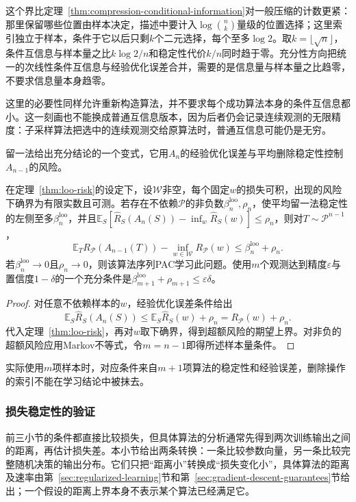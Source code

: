 这个界比定理~\ref{thm:compression-conditional-information}对一般压缩的计数更紧：那里保留哪些位置由样本决定，描述中要计入$\log\binom nk$量级的位置选择；这里索引独立于样本，条件于它以后只剩$k$个二元选择，每个至多$\log2$。取$k=\lfloor\sqrt n\rfloor$，条件互信息与样本量之比$k\log2/n$和稳定性代价$k/n$同时趋于零。充分性方向把统一的次线性条件互信息与经验优化误差合并，需要的是信息量与样本量之比趋零，不要求信息量本身趋零。

这里的必要性同样允许重新构造算法，并不要求每个成功算法本身的条件互信息都小。这一刻画也不能换成普通互信息版本，因为后者仍会记录连续观测的无限精度：子采样算法把选中的连续观测交给原算法时，普通互信息可能仍是无穷。

留一法给出充分结论的一个变式，它用$A_n$的经验优化误差与平均删除稳定性控制$A_{n-1}$的风险。

\begin{theorem}[留一法稳定性与可学习性]
\label{thm:loo-learning}
在定理~\ref{thm:loo-risk}的设定下，设$\mathcal W$非空，每个固定$w$的损失可积，出现的风险下确界为有限实数且可测。若存在不依赖$\mathcal P$的非负数$\beta_n^{\mathrm{loo}},\rho_n$，使平均留一法稳定性的左侧至多$\beta_n^{\mathrm{loo}}$，并且$\mathbb E_S[\hat R_S(A_n(S))-\inf_w\hat R_S(w)]\leq\rho_n$，则对$T\sim\mathcal P^{n-1}$，
\[
 \mathbb E_T R_{\mathcal P}(A_{n-1}(T))-\inf_{w\in\mathcal W}R_{\mathcal P}(w)\leq\beta_n^{\mathrm{loo}}+\rho_n.
\]
若$\beta_n^{\mathrm{loo}}\to0$且$\rho_n\to0$，则该算法序列PAC学习此问题。使用$m$个观测达到精度$\varepsilon$与置信度$1-\delta$的一个充分条件是$\beta_{m+1}^{\mathrm{loo}}+\rho_{m+1}\leq\varepsilon\delta$。
\end{theorem}
\begin{proof}
对任意不依赖样本的$w$，经验优化误差条件给出
\[
 \mathbb E_S\hat R_S(A_n(S))\leq\mathbb E_S\hat R_S(w)+\rho_n=R_{\mathcal P}(w)+\rho_n.
\]
代入定理~\ref{thm:loo-risk}，再对$w$取下确界，得到超额风险的期望上界。对非负的超额风险应用Markov不等式，令$m=n-1$即得所述样本量条件。
\end{proof}

实际使用$m$项样本时，对应条件来自$m+1$项算法的稳定性和经验误差，删除操作的索引不能在学习结论中被抹去。
\subsubsection{损失稳定性的验证}
\label{sec:parameter-stability}

前三小节的条件都直接比较损失，但具体算法的分析通常先得到两次训练输出之间的距离，再估计损失差。本小节给出两条转换：一条比较参数向量，另一条比较完整随机决策的输出分布。它们只把“距离小”转换成“损失变化小”，具体算法的距离及速率由第~\ref{sec:regularized-learning}节和第~\ref{sec:gradient-descent-guarantees}节给出；一个假设的距离上界本身不表示某个算法已经满足它。

